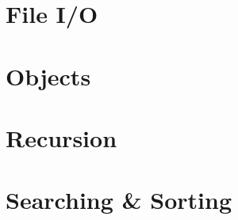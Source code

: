 \documentclass[12pt]{scrbook}
\begin{document}
\chapter{File I/O}
\label{chapter:php:fileIO}


\chapter{Objects}
\label{chapter:php:objects}


\chapter{Recursion}
\label{chapter:php:recursion}


\chapter{Searching \& Sorting}
\label{chapter:php:searchingSorting}


\backmatter

\newpage
\printglossaries
\forallglsentries{\thislabel}%
{%
  \ifglsused{\thislabel}{}{\glsadd[format=ignore]{\thislabel}}%
}

{}
\printindex
{}

{}
\nocite{*}

%

\end{document}
